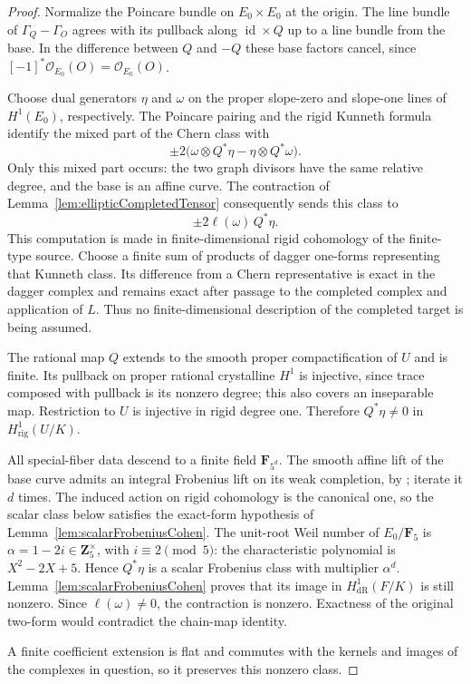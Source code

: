 \documentclass[11pt,a4paper]{article}
\theoremstyle{remark}
\begin{document}
\begin{proof}
Normalize the Poincare bundle on $E_0\times E_0$ at the origin.
The line bundle of $\Gamma_Q-\Gamma_O$ agrees with its pullback
along $\operatorname{id}\times Q$ up to a line bundle from the base.
In the difference between $Q$ and $-Q$ these base factors cancel,
since $[-1]^*\mathcal O_{E_0}(O)=\mathcal O_{E_0}(O)$.

Choose dual generators $\eta$ and $\omega$ on the proper slope-zero
and slope-one lines of $H^1(E_0)$, respectively.  The Poincare pairing
and the rigid Kunneth formula identify the mixed part of the Chern
class with
\[
 \pm2\bigl(\omega\otimes Q^*\eta
                   -\eta\otimes Q^*\omega\bigr).
\]
Only this mixed part occurs: the two graph divisors have the same
relative degree, and the base is an affine curve.  The contraction
of Lemma~\ref{lem:ellipticCompletedTensor} consequently sends this
class to
\[
 \pm2\ell(\omega)\,Q^*\eta.
\]
This computation is made in finite-dimensional rigid cohomology of
the finite-type source.  Choose a finite sum of products of dagger
one-forms representing that Kunneth class.  Its difference from a
Chern representative is exact in the dagger complex and remains
exact after passage to the completed complex and application of $L$.
Thus no finite-dimensional description of the completed target is
being assumed.

The rational map $Q$ extends to the smooth proper compactification
of $U$ and is finite.  Its pullback on proper rational crystalline
$H^1$ is injective, since trace composed with pullback is its nonzero
degree; this also covers an inseparable map.  Restriction to $U$ is
injective in rigid degree one.  Therefore $Q^*\eta\ne0$ in
$H^1_{\mathrm{rig}}(U/K)$.

All special-fiber data descend to a finite field $\mathbf F_{5^d}$.
The smooth affine lift of the base curve admits an integral
Frobenius lift on its weak completion, by
\cite[Introduction, p.~198]{DavisLangerZink}; iterate it $d$ times.
The induced action on rigid cohomology is the canonical one, so the
scalar class below satisfies the exact-form hypothesis of
Lemma~\ref{lem:scalarFrobeniusCohen}.
The unit-root Weil number of $E_0/\mathbf F_5$ is
$\alpha=1-2i\in\mathbf Z_5^\times$, with $i\equiv2\pmod5$:
the characteristic polynomial is $X^2-2X+5$.  Hence $Q^*\eta$ is a
scalar Frobenius class with multiplier $\alpha^d$.
Lemma~\ref{lem:scalarFrobeniusCohen} proves that its image in
$H^1_{\mathrm{dR}}(F/K)$ is still nonzero.  Since
$\ell(\omega)\ne0$, the contraction is nonzero.  Exactness of the
original two-form would contradict the chain-map identity.

A finite coefficient extension is flat and commutes with the kernels
and images of the complexes in question, so it preserves this
nonzero class.
\end{proof}
\end{document}
